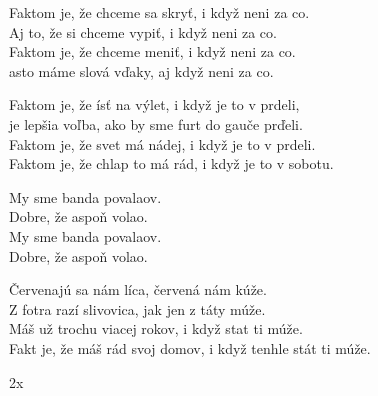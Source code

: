 
\ve{}
Faktom je, že chceme sa skryť, i když neni za co.\\
Aj to, že si chceme vypiť, i když neni za co.\\
Faktom je, že chceme meniť, i když neni za co.\\
asto máme slová vďaky, aj když neni za co.

\ve{}
Faktom je, že ísť na výlet, i když je to v prdeli,\\
je lepšia voľba, ako by sme furt do gauče prďeli.\\
Faktom je, že svet má nádej, i když je to v prdeli.\\
Faktom je, že chlap to má rád, i když je to v sobotu.

\cho{}
My sme banda povalaov.\\
Dobre, že aspoň volao.\\
My sme banda povalaov.\\
Dobre, že aspoň volao.

\ve{}
Červenajú sa nám líca, červená nám kúže.\\
Z fotra razí slivovica, jak jen z táty múže.\\
Máš už trochu viacej rokov, i když stat ti múže.\\
Fakt je, že máš rád svoj domov, i když tenhle stát ti múže.

\cho{}
2x

\esong